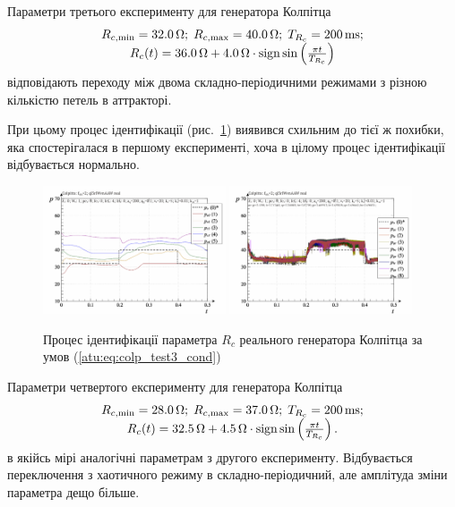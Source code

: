 Параметри третього експерименту для генератора Колпітца
%
\begin{equation}
  \begin{array}{c}
    R_{c,\min} = \SI{32.0}{\ohm};
    \;
    R_{c,\max} = \SI{40.0}{\ohm};
    \;
    T_{R_c} = \SI{200}{\milli\second};
  \\
    R_c(t) = \SI{36.0}{\ohm} + \SI{4.0}{\ohm} \cdot \operatorname*{sign} \sin \left(   \frac{\pi t}{T_{R_c}}   \right)
  \end{array}
  \label{atu:eq:colp_test3_cond}
\end{equation}
%
відповідають переходу між двома складно-періодичними режимами
з різною кількістю петель в аттракторі.

При цьому процес ідентифікації (рис.~\ref{atu:f:colp_r_id_3}) виявився
схильним до тієї ж похибки, яка спостерігалася в першому
експерименті, хоча в цілому процес ідентифікації відбувається
нормально.


\begin{figure}[htb!]
  \centerline{
    \includegraphics[width=0.48\textwidth]{p/r/colp_real_id-p_t_pi_ql3rlWvnAAW_real_d_2.png}
    \hfill
    \includegraphics[width=0.48\textwidth]{p/r/colp_real_id-p_t_p_ql3rlWvnAAW_real_d_2.png}
  }
\caption{Процес ідентифікації параметра $ R_c $ реального генератора Колпітца за умов (\ref{atu:eq:colp_test3_cond})}
\label{atu:f:colp_r_id_3}
\end{figure}



Параметри четвертого експерименту для генератора Колпітца
%
\begin{equation}
  \begin{array}{c}
    R_{c,\min} = \SI{28.0}{\ohm};
    \;
    R_{c,\max} = \SI{37.0}{\ohm};
    \;
    T_{R_c} = \SI{200}{\milli\second};
  \\
    R_c(t) = \SI{32.5}{\ohm} + \SI{4.5}{\ohm} \cdot \operatorname*{sign} \sin \left( \frac{\pi t}{T_{R_c}}  \right).
  \end{array}
  \label{atu:eq:colp_test4_cond}
\end{equation}
%
в якійсь мірі аналогічні параметрам з другого
експерименту. Відбувається переключення з хаотичного режиму в
складно-періодичний, але амплітуда зміни параметра дещо більше.

